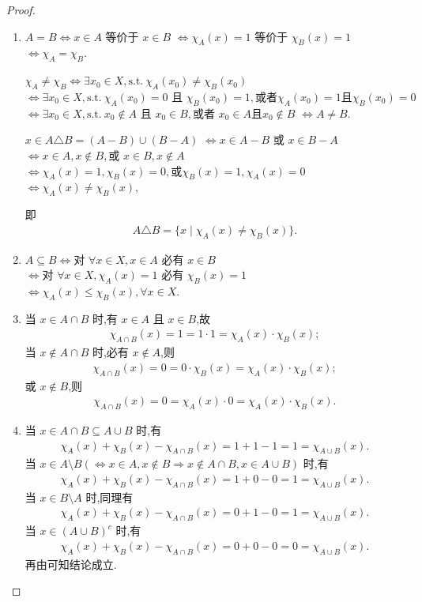 \documentclass[../../main.tex]{subfiles}%
\begin{document}
\begin{proof}
\begin{enumerate}[(1)]
\item 
$A=B \iff  x\in A$ 等价于 $x\in B$
$\iff  \chi_A(x)=1$ 等价于 $\chi_B(x)=1$
$\iff  \chi_A=\chi_B$.

$\chi_A\neq\chi_B \iff  \exists x_0\in X,\text{s.t.}\ \chi_A(x_0)\neq\chi_B(x_0)$
$\iff  \exists x_0\in X,\text{s.t.}\ \chi_A(x_0)=0 \text{ 且 } \chi_B(x_0)=1,\text{或者}\chi_A(x_0)=1 \text{且}\chi_B(x_0)=0$
$\iff  \exists x_0\in X,\text{s.t.}\ x_0\notin A \text{ 且 } x_0\in B,\text{或者 } x_0\in A \text{且}x_0\notin B$
$\iff  A\neq B$.

$x\in A\triangle B = (A-B)\cup(B-A)$
$\iff  x\in A-B \text{ 或 } x\in B-A$
$\iff  x\in A,x\notin B,\text{或 } x\in B,x\notin A$
$\iff  \chi_A(x)=1,\chi_B(x)=0,\text{或}\chi_B(x)=1,\chi_A(x)=0$
$\iff  \chi_A(x)\neq\chi_B(x),$

即
\begin{align*}
A\triangle B = \{x \mid \chi_A(x) \neq \chi_B(x)\}.
\end{align*}

\item 
$A\subseteq B \iff \text{对 } \forall x\in X,x\in A \text{ 必有 } x\in B$
$\iff \text{对 } \forall x\in X,\chi_A(x)=1 \text{ 必有 } \chi_B(x)=1$
$\iff  \chi_A(x)\leqslant\chi_B(x),\forall x\in X.$

\item 
当 $x\in A\cap B$ 时,有 $x\in A$ 且 $x\in B$,故
\begin{align*}
\chi_{A\cap B}(x) = 1 = 1\cdot 1 = \chi_A(x)\cdot \chi_B(x);
\end{align*}
当 $x\notin A\cap B$ 时,必有 $x\notin A$,则
\begin{align*}
\chi_{A\cap B}(x) = 0 = 0\cdot \chi_B(x) = \chi_A(x)\cdot \chi_B(x);
\end{align*}
或 $x\notin B$,则
\begin{align*}
\chi_{A\cap B}(x) = 0 = \chi_A(x)\cdot 0 = \chi_A(x)\cdot \chi_B(x).
\end{align*}

\item 
当 $x\in A\cap B\subseteq A\cup B$ 时,有
\begin{align*}
\chi_A(x) + \chi_B(x) - \chi_{A\cap B}(x) = 1+1-1 = 1 = \chi_{A\cup B}(x).
\end{align*}
当 $x\in A\setminus B(\iff  x\in A,x\notin B\Rightarrow x\notin A\cap B,x\in A\cup B)$ 时,有
\begin{align*}
\chi_A(x) + \chi_B(x) - \chi_{A\cap B}(x) = 1+0-0 = 1 = \chi_{A\cup B}(x).
\end{align*}
当 $x\in B\setminus A$ 时,同理有
\begin{align*}
\chi_A(x) + \chi_B(x) - \chi_{A\cap B}(x) = 0+1-0 = 1 = \chi_{A\cup B}(x).
\end{align*}
当 $x\in (A\cup B)^c$ 时,有
\begin{align*}
\chi_A(x) + \chi_B(x) - \chi_{A\cap B}(x) = 0+0-0 = 0 = \chi_{A\cup B}(x).
\end{align*}
再由可知结论成立.


\end{enumerate}
\end{proof}
\end{document}
